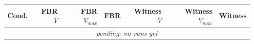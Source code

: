 \begin{tabular}{l rrl rrl}
\toprule
Cond. & FBR $\bar V$ & FBR $V_{max}$ & FBR & Witness $\bar V$ & Witness $V_{max}$ & Witness \\
\midrule
\multicolumn{7}{c}{\textit{pending: no runs yet}} \\
\bottomrule
\end{tabular}
